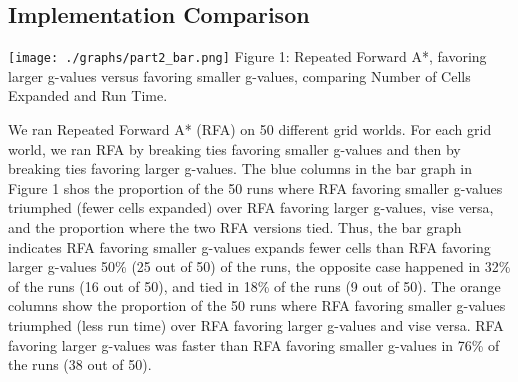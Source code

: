 \documentclass[10pt,a4paper]{article}
\begin{document}
\subsection*{Implementation Comparison}
\begin{center}
\texttt{[image: ./graphs/part2\_bar.png]}
\newline
Figure 1: Repeated Forward A*, favoring larger g-values versus favoring smaller g-values, comparing Number of Cells Expanded and Run Time.
\newline
\end{center}
We ran Repeated Forward A* (RFA) on 50 different grid worlds. For each grid world, we ran RFA by breaking ties favoring smaller g-values and then by breaking ties favoring larger g-values.
\newline\newline
The blue columns in the bar graph in Figure 1 shos the proportion of the 50 runs where RFA favoring smaller g-values triumphed (fewer cells expanded) over RFA favoring larger g-values, vise versa, and the proportion where the two RFA versions tied. Thus, the bar graph indicates RFA favoring smaller g-values expands fewer cells than RFA favoring larger g-values 50\% (25 out of 50) of the runs, the opposite case happened in 32\% of the runs (16 out of 50), and tied in 18\% of the runs (9 out of 50).
\newline\newline
The orange columns show the proportion of the 50 runs where RFA favoring smaller g-values triumphed (less run time) over RFA favoring larger g-values and vise versa. RFA favoring larger g-values was faster than RFA favoring smaller g-values in 76\% of the runs (38 out of 50).
\newline\newline
\end{document}
